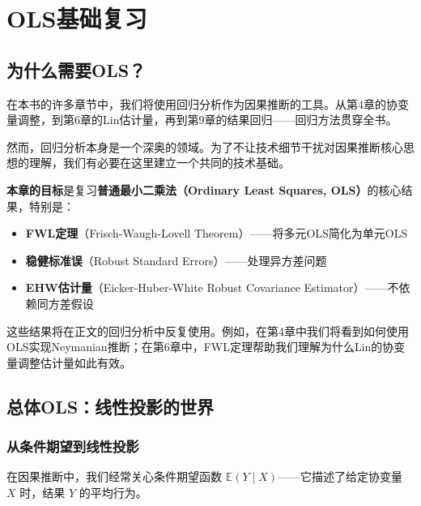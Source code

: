 
\chapter{OLS基础复习}\label{ch:B}

\section{为什么需要OLS？}\label{sec:B-why-ols}

在本书的许多章节中，我们将使用回归分析作为因果推断的工具。从第4章的协变量调整，到第6章的Lin估计量，再到第9章的结果回归——回归方法贯穿全书。

然而，回归分析本身是一个深奥的领域。为了不让技术细节干扰对因果推断核心思想的理解，我们有必要在这里建立一个共同的技术基础。

\textbf{本章的目标}是复习\textbf{普通最小二乘法（Ordinary Least Squares, OLS）}的核心结果，特别是：
\begin{itemize}
  \item \textbf{FWL定理}（Frisch-Waugh-Lovell Theorem）——将多元OLS简化为单元OLS
  \item \textbf{稳健标准误}（Robust Standard Errors）——处理异方差问题
  \item \textbf{EHW估计量}（Eicker-Huber-White Robust Covariance Estimator）——不依赖同方差假设
\end{itemize}

这些结果将在正文的回归分析中反复使用。例如，在第4章中我们将看到如何使用OLS实现Neymanian推断；在第6章中，FWL定理帮助我们理解为什么Lin的协变量调整估计量如此有效。


\section{总体OLS：线性投影的世界}\label{sec:B-population-ols}

\subsection{从条件期望到线性投影}\label{sec:B-conditional-expectation}

在因果推断中，我们经常关心条件期望函数 $\mathbb{E}(Y \mid X)$——它描述了给定协变量 $X$ 时，结果 $Y$ 的平均行为。

